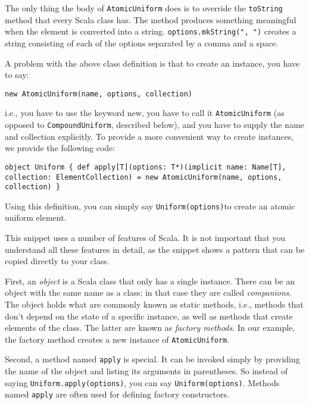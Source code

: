 The only thing the body of  \texttt{AtomicUniform} does is to override the \texttt{toString} method that every Scala class has. The method produces something meaningful when the element is converted into a string. \texttt{options.mkString(", ")} creates a string consisting of each of the options separated by a comma and a space.

A problem with the above class definition is that to create an instance, you have to say:

\begin{flushleft}
\texttt{new AtomicUniform(name, options, collection)}
\end{flushleft}

i.e., you have to use the keyword new, you have to call it \texttt{AtomicUni\-form} (as opposed to \texttt{CompoundUniform}, described below), and you have to supply the name and collection explicitly. To provide a more convenient way to create instances, we provide the following code:

\begin{flushleft}
\texttt{object \texttt{Uniform} \{
\newline \tab def apply[T](options: T*)(implicit name: Name[T], collection:
\newline \tab ElementCollection) =
\newline \tab new AtomicUniform(name, options, collection)
\}
}
\end{flushleft}

Using this definition, you can simply say \texttt{Uniform(options)}to create an atomic uniform element.

This snippet uses a number of features of Scala. It is not important that you understand all these features in detail, as the snippet shows a pattern that can be copied directly to your class.

First, an \emph{object} is a Scala class that only has a single instance. There can be an object with the same name as a class; in that case they are called \emph{companions}. The object holds what are commonly known as static methods, i.e., methods that don't depend on the state of a specific instance, as well as methods that create elements of the class. The latter are known as \emph{factory methods}. In our example, the factory method creates a new instance of \texttt{AtomicUniform}.

Second, a method named \texttt{apply} is special. It can be invoked simply by providing the name of the object and listing its arguments in parentheses. So instead of saying \texttt{Uniform.apply(options)}, you can say \texttt{Uniform(options)}. Methods named \texttt{apply} are often used for defining factory constructors.


